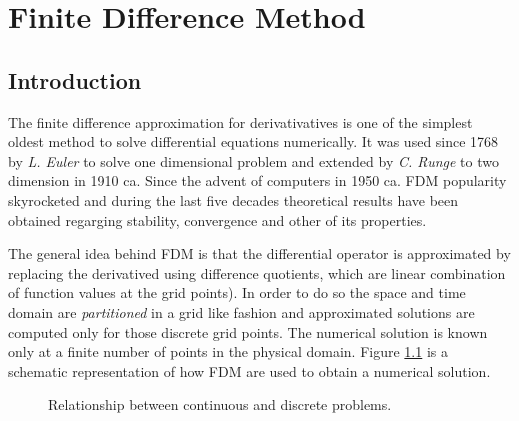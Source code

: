 
\chapter{Finite Difference Method}

\section{Introduction}
The finite difference approximation for derivativatives is one of the simplest oldest method to solve differential equations numerically. It was used since 1768 by \textit{L. Euler} to solve one dimensional problem and extended by \textit{C. Runge} to two dimension in 1910 ca. Since the advent of computers in 1950 ca. FDM  popularity skyrocketed and during the last five decades theoretical results have been obtained regarging stability, convergence and other of its properties.



    The general idea behind FDM is that the differential operator is approximated by replacing the derivatived using difference quotients, which are linear combination of function values at the grid points). In order to do so the space and time domain are \textit{partitioned} in a grid like fashion and approximated solutions are computed only for those discrete grid points. The numerical solution is known only at a finite number of points in the physical domain.
    Figure \ref{fig:schematic_repr_fdm} is a schematic representation of how FDM are used to obtain a numerical solution.
    \begin{figure}
    \centering
    \caption{Relationship between continuous and discrete problems.}
    \label{fig:schematic_repr_fdm}
\end{figure}
    
